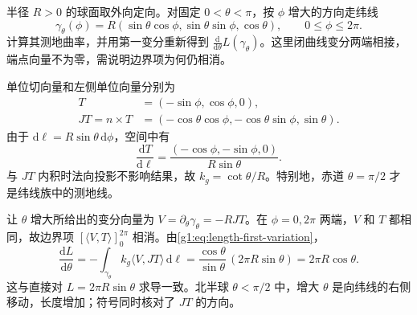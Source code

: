 \begin{exercise}
	\label{g1:ex:latitude-geodesic-curvature}
	半径 \(R>0\) 的球面取外向定向。对固定 \(0<\theta<\pi\)，按 \(\phi\) 增大的方向走纬线
	\[
		\gamma_\theta(\phi)=R(\sin\theta\cos\phi,\sin\theta\sin\phi,\cos\theta),\qquad 0\le\phi\le2\pi.
	\]
	计算其测地曲率，并用第一变分重新得到 \(\frac{\mathrm{d}}{\mathrm{d}\theta}L(\gamma_\theta)\)。这里闭曲线变分两端相接，端点向量不为零，需说明边界项为何仍相消。
\end{exercise}
\begin{solution}
	单位切向量和左侧单位向量分别为
	\begin{align*}
		T&=(-\sin\phi,\cos\phi,0),\\
		JT=n\times T&=(-\cos\theta\cos\phi,-\cos\theta\sin\phi,\sin\theta).
	\end{align*}
	由于 \(\mathrm{d}\ell=R\sin\theta\,\mathrm{d}\phi\)，空间中有
	\[
		\frac{\mathrm{d}T}{\mathrm{d}\ell}=\frac{(-\cos\phi,-\sin\phi,0)}{R\sin\theta}.
	\]
	与 \(JT\) 内积时法向投影不影响结果，故 \(k_g=\cot\theta/R\)。特别地，赤道 \(\theta=\pi/2\) 才是纬线族中的测地线。

	让 \(\theta\) 增大所给出的变分向量为 \(V=\partial_\theta\gamma_\theta=-RJT\)。在 \(\phi=0,2\pi\) 两端，\(V\) 和 \(T\) 都相同，故边界项 \([\langle V,T\rangle]_0^{2\pi}\) 相消。由\eqref{g1:eq:length-first-variation}，
	\[
		\frac{\mathrm{d}L}{\mathrm{d}\theta}
		=-\int_{\gamma_\theta}k_g\langle V,JT\rangle\,\mathrm{d}\ell
		=\frac{\cos\theta}{\sin\theta}\,(2\pi R\sin\theta)
		=2\pi R\cos\theta.
	\]
	这与直接对 \(L=2\pi R\sin\theta\) 求导一致。北半球 \(\theta<\pi/2\) 中，增大 \(\theta\) 是向纬线的右侧移动，长度增加；符号同时核对了 \(JT\) 的方向。
\end{solution}

